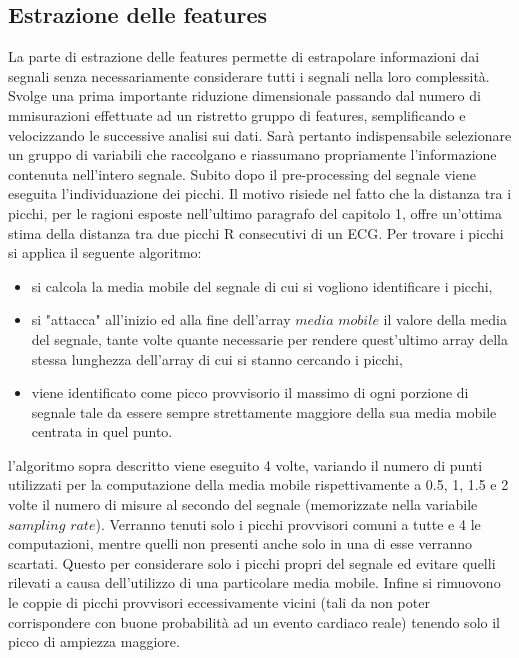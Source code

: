 \documentclass[12pt,a4paper, twoside, openright]{report}
\begin{document}
\subsection{Estrazione delle features}

La parte di estrazione delle features permette di estrapolare informazioni dai segnali senza necessariamente considerare tutti i segnali nella loro complessità.
Svolge una prima importante riduzione dimensionale passando dal numero di mmisurazioni effettuate ad un ristretto gruppo di features, semplificando e velocizzando le successive analisi sui dati.
Sarà pertanto indispensabile selezionare un gruppo di variabili che raccolgano e riassumano propriamente l'informazione contenuta nell'intero segnale.
Subito dopo il pre-processing del segnale viene eseguita l'individuazione dei picchi.
Il motivo risiede nel fatto che la distanza tra i picchi, per le ragioni esposte nell'ultimo paragrafo del capitolo 1, offre un'ottima stima della distanza tra due picchi R consecutivi di un ECG.
Per trovare i picchi si applica il seguente algoritmo:\begin{itemize}
	\item si calcola la media mobile del segnale di cui si vogliono identificare i 					  picchi,
	\item si "attacca" all'inizio ed alla fine dell'array $media$ $mobile$ il valore 				  della media del segnale, tante volte quante necessarie per rendere 						  quest'ultimo array della stessa lunghezza dell'array di cui si stanno 					  cercando i picchi,
	\item viene identificato come picco provvisorio il massimo di ogni porzione di 					  segnale tale da essere sempre strettamente maggiore della sua media mobile 				  centrata in quel punto.
\end{itemize}
l'algoritmo sopra descritto viene eseguito 4 volte, variando il numero di punti utilizzati per la computazione della media mobile rispettivamente a 0.5, 1, 1.5 e 2 volte il numero di misure al secondo del segnale (memorizzate nella variabile $sampling$ $rate$).
Verranno tenuti solo i picchi provvisori comuni a tutte e 4 le computazioni, mentre quelli non presenti anche solo in una di esse verranno scartati.
Questo per considerare solo i picchi propri del segnale ed evitare quelli rilevati a causa dell'utilizzo di una particolare media mobile.
Infine si rimuovono le coppie di picchi provvisori eccessivamente vicini (tali da non poter corrispondere con buone probabilità ad un evento cardiaco reale) tenendo solo il picco di ampiezza maggiore.
\end{document}
